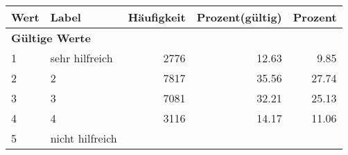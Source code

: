      \begin{longtable}{lXrrr}
     \toprule
     \textbf{Wert} & \textbf{Label} & \textbf{Häufigkeit} & \textbf{Prozent(gültig)} & \textbf{Prozent} \\
     \endhead
     \midrule
     \multicolumn{5}{l}{\textbf{Gültige Werte}}\\

     1 &
     \multicolumn{1}{X}{ sehr hilfreich   } &


       \num{2776} &
       \num[round-mode=places,round-precision=2]{12.63} &
         \num[round-mode=places,round-precision=2]{9.85} \\

     2 &
     \multicolumn{1}{X}{ 2   } &


       \num{7817} &
       \num[round-mode=places,round-precision=2]{35.56} &
         \num[round-mode=places,round-precision=2]{27.74} \\

     3 &
     \multicolumn{1}{X}{ 3   } &


       \num{7081} &
       \num[round-mode=places,round-precision=2]{32.21} &
         \num[round-mode=places,round-precision=2]{25.13} \\

     4 &
     \multicolumn{1}{X}{ 4   } &


       \num{3116} &
       \num[round-mode=places,round-precision=2]{14.17} &
         \num[round-mode=places,round-precision=2]{11.06} \\

     5 &
     \multicolumn{1}{X}{ nicht hilfreich   } &



\end{longtable}
